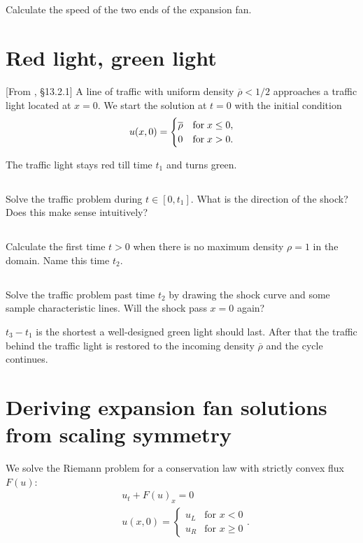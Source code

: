 \documentclass[11pt,letterpaper]{report}
\begin{document}
\subsection{}
Calculate the speed of the two ends of the expansion fan.

\section{Red light, green light}
[From \cite{ShearerLevy_15}, \S13.2.1] A line of traffic with uniform density $\overline{\rho}<1/2$ approaches a traffic light located at $x=0$. We start the solution at $t=0$ with the initial condition
\begin{align}
    u(x,0) = \begin{cases}
        \overline{\rho} & \text{for\;} x\leq 0,\\
        0 & \text{for\;} x>0.
    \end{cases}
\end{align}

The traffic light stays red till time $t_1$ and turns green. 

\subsection{}
Solve the traffic problem during $t\in[0,t_1]$. What is the direction of the shock? Does this make sense intuitively?

\subsection{}
Calculate the first time $t>0$ when there is no maximum density $\rho=1$ in the domain. Name this time $t_2$.

\subsection{}
Solve the traffic problem past time $t_2$ by drawing the shock curve and some sample characteristic lines. Will the shock pass $x=0$ again? 

$t_3-t_1$ is the shortest a well-designed green light should last. After that the traffic behind the traffic light is restored to the incoming density $\overline{\rho}$ and the cycle continues.

\section{Deriving expansion fan solutions from scaling symmetry}
We solve the Riemann problem for a conservation law with strictly convex flux $F(u)$:
\begin{align}
    & u_t+F(u)_x = 0\\
    & u(x,0) = \begin{cases}
        u_L &\text{for }x<0\\
        u_R &\text{for }x\geq 0
    \end{cases}.
\end{align}
\end{document}
